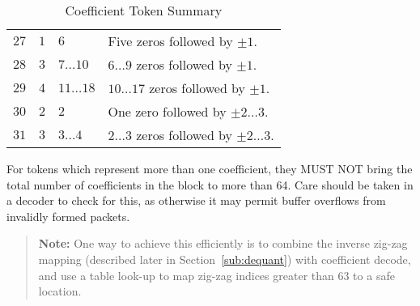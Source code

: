 \documentclass[9pt,letterpaper]{book}
\numberwithin{equation}{chapter}
\numberwithin{figure}{chapter}
\numberwithin{table}{chapter}
\begin{document}
\begin{table}[htbp]
\begin{center}
\begin{tabularx}{\textwidth}{cclX}
$27$         & $1$  & $6$           & Five zeros followed by
 $\pm 1$. \\
$28$         & $3$  & $7\ldots 10$  & $6\ldots 9$ zeros followed by
 $\pm 1$.  \\
$29$         & $4$  & $11\ldots 18$ & $10\ldots 17$ zeros followed by
 $\pm 1$.\\
$30$         & $2$  & $2$           & One zero followed by
 $\pm 2\ldots 3$. \\
$31$         & $3$  & $3\ldots 4$   & $2\ldots 3$ zeros followed by
 $\pm 2\ldots 3$. \\
\bottomrule\end{tabularx}
\end{center}
\caption{Coefficient Token Summary}
\label{tab:coeff-tokens}
\end{table}

For tokens which represent more than one coefficient, they MUST NOT bring the
 total number of coefficients in the block to more than 64.
Care should be taken in a decoder to check for this, as otherwise it may permit
 buffer overflows from invalidly formed packets.
\begin{verse}
{\bf Note:} One way to achieve this efficiently is to combine the inverse
 zig-zag mapping (described later in Section~\ref{sub:dequant}) with
 coefficient decode, and use a table look-up to map zig-zag indices greater
 than 63 to a safe location.
\end{verse}
\end{document}
